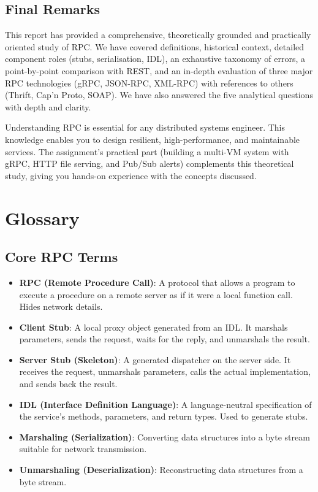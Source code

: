 \documentclass[10pt,a4paper]{article}
\begin{document}
\subsection{Final Remarks}
This report has provided a comprehensive, theoretically grounded and practically oriented study of RPC. We have covered definitions, historical context, detailed component roles (stubs, serialisation, IDL), an exhaustive taxonomy of errors, a point-by-point comparison with REST, and an in-depth evaluation of three major RPC technologies (gRPC, JSON-RPC, XML-RPC) with references to others (Thrift, Cap’n Proto, SOAP). We have also answered the five analytical questions with depth and clarity.

Understanding RPC is essential for any distributed systems engineer. This knowledge enables you to design resilient, high-performance, and maintainable services. The assignment’s practical part (building a multi-VM system with gRPC, HTTP file serving, and Pub/Sub alerts) complements this theoretical study, giving you hands-on experience with the concepts discussed.

\section*{Glossary}
\subsection*{Core RPC Terms}
\begin{itemize}
    \item \textbf{RPC (Remote Procedure Call)}: A protocol that allows a program to execute a procedure on a remote server as if it were a local function call. Hides network details.
    \item \textbf{Client Stub}: A local proxy object generated from an IDL. It marshals parameters, sends the request, waits for the reply, and unmarshals the result.
    \item \textbf{Server Stub (Skeleton)}: A generated dispatcher on the server side. It receives the request, unmarshals parameters, calls the actual implementation, and sends back the result.
    \item \textbf{IDL (Interface Definition Language)}: A language-neutral specification of the service’s methods, parameters, and return types. Used to generate stubs.
    \item \textbf{Marshaling (Serialization)}: Converting data structures into a byte stream suitable for network transmission.
    \item \textbf{Unmarshaling (Deserialization)}: Reconstructing data structures from a byte stream.
\end{itemize}
\end{document}
